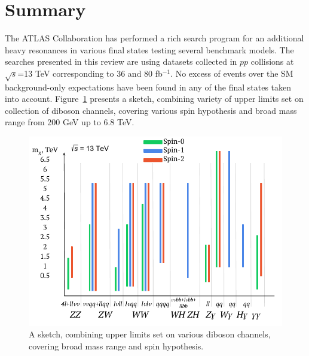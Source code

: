 \documentclass{PoS}
\begin{document}
\section{Summary}
\label{sec:sum}

The ATLAS Collaboration has performed a rich search program for an additional heavy resonances in various final states testing several benchmark models.
The searches presented in this review are using datasets collected in $pp$ collisions at $\sqrt{s}$=13 TeV corresponding to 36 and 80 fb$^{-1}$.
No excess of events over the SM background-only expectations have been found in any of the final states taken into account. 
 Figure~\ref{fig:summary} presents a sketch, combining variety of upper limits set on collection of diboson channels, covering various spin hypothesis and broad mass range from 200 GeV up to 6.8 TeV.


  \begin{figure}
    \begin{center} 
    \includegraphics[width=.65\textwidth]{figures/lim_sketch}
    \end{center}
     \caption{A sketch, combining upper limits set on various diboson channels, covering broad mass range and spin hypothesis.}
     \label{fig:summary}
     \end{figure}







%
\end{document}
